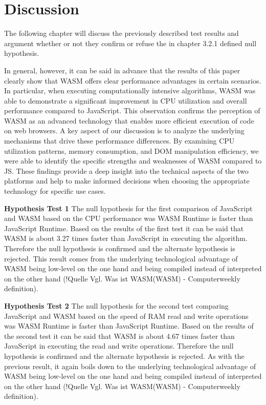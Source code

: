 \newpage
\section{Discussion} \label{discussion}
The following chapter will discuss the previously described test results and argument whether or not they confirm or refuse the in chapter 3.2.1 defined null hypothesis. 

In general, however, it can be said in advance that the results of this paper clearly show that WASM offers clear performance advantages in certain scenarios. In particular, when executing computationally intensive algorithms, WASM was able to demonstrate a significant improvement in CPU utilization and overall performance compared to JavaScript. This observation confirms the perception of WASM as an advanced technology that enables more efficient execution of code on web browsers. 
A key aspect of our discussion is to analyze the underlying mechanisms that drive these performance differences. By examining CPU utilization patterns, memory consumption, and DOM manipulation efficiency, we were able to identify the specific strengths and weaknesses of WASM compared to JS. These findings provide a deep insight into the technical aspects of the two platforms and help to make informed decisions when choosing the appropriate technology for specific use cases.

\textbf{Hypothesis Test 1} \newline
The null hypothesis for the first comparison of JavaScript and WASM based on the CPU performance was \dq WASM Runtime is faster than JavaScript Runtime\dq . Based on the results of the first test it can be said that WASM is about 3.27 times faster than JavaScript in executing the algorithm. Therefore the null hypothesis is confirmed and the alternate hypothesis is rejected. This result comes from the underlying technological advantage of WASM being low-level on the one hand and being compiled instead of interpreted on the other hand (!Quelle Vgl. Was ist WASM(WASM) - Computerweekly definition).

\textbf{Hypothesis Test 2} \newline
The null hypothesis for the second test comparing JavaScript and WASM based on the speed of RAM read and write operations was \dq WASM Runtime is faster than JavaScript Runtime\dq . Based on the results of the second test it can be said that WASM is about 4.67 times faster than JavaScript in executing the read and write operations. Therefore the null hypothesis is confirmed and the alternate hypothesis is rejected. As with the previous result, it again boils down to the underlying technological advantage of WASM being low-level on the one hand and being compiled instead of interpreted on the other hand (!Quelle Vgl. Was ist WASM(WASM) - Computerweekly definition).

